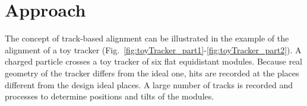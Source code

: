 \section{Approach}
\label{sec:alignmentAlg}


The concept of track-based alignment can be illustrated in the example of the alignment of a toy tracker (Fig.~\ref{fig:toyTracker_part1}-\ref{fig:toyTracker_part2}). A charged particle crosses a toy tracker of six flat equidistant modules. Because real geometry of the tracker differs from the ideal one, hits are recorded at the places different from the design ideal places. A large number of tracks is recorded and processes to determine positions and tilts of the modules.

